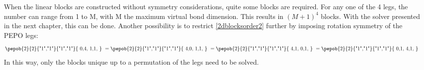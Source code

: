 When the linear blocks are constructed without symmetry considerations, quite some blocks are required. For any one of the 4 legs, the number can range from 1 to M, with M the maximum virtual bond dimension. This results in $(M+1)^4$ blocks. With the solver presented in the next chapter, this can be done. Another possibility is to restrict \cref{2dblocksorder2} further by imposing rotation symmetry of the PEPO legs:
\begin{equation}\label{eq:rotsympepo}
    \vcenter{ \hbox{\pepob{2}{2}{{"1","1"}}{{"1","1"}}{{
                        0,4,
                        1,1,
                    }} } } =     \vcenter{ \hbox{\pepob{2}{2}{{"1","1"}}{{"1","1"}}{{
                        4,0,
                        1,1,
                    }} } } = \vcenter{ \hbox{\pepob{2}{2}{{"1","1"}}{{"1","1"}}{{
                        4,1,
                        0,1,
                    }} } }= \vcenter{ \hbox{\pepob{2}{2}{{"1","1"}}{{"1","1"}}{{
                        0,1,
                        4,1,
                    }} } }
\end{equation}
In this way, only the blocks unique up to a permutation of the legs need to be solved.


